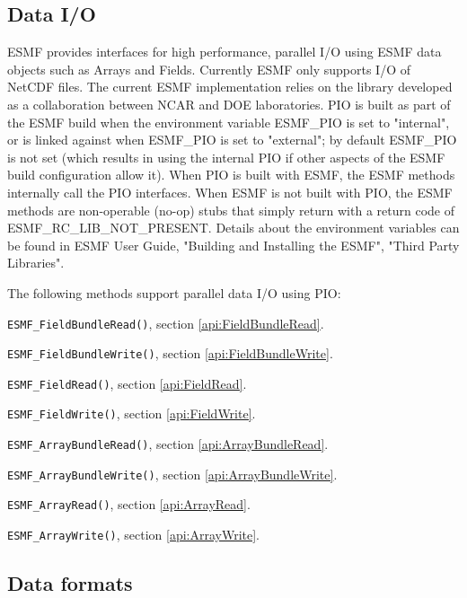 \subsection{Data I/O}
\label{io:dataio}

\begin{sloppypar}
ESMF provides interfaces for high performance, parallel I/O using ESMF data
objects such as Arrays and Fields.  Currently ESMF only supports I/O of
NetCDF files.  The current ESMF implementation relies on the 
library developed as a collaboration between NCAR and DOE laboratories.  PIO
is built as part of the ESMF build when the environment variable ESMF\_PIO is
set to "internal", or is linked against when ESMF\_PIO is set to "external"; by
default ESMF\_PIO is not set (which results in using the internal PIO if other
aspects of the ESMF build configuration allow it).  When PIO is built with ESMF,
the ESMF methods internally call the PIO interfaces.  When ESMF is not built with
PIO, the ESMF methods are non-operable (no-op) stubs that simply return with
a return code of ESMF\_RC\_LIB\_NOT\_PRESENT.  Details about the environment
variables can be found in ESMF User Guide, "Building and Installing the ESMF",
"Third Party Libraries".
\end{sloppypar}

The following methods support parallel data I/O using PIO:

\begin{description}
\item {\tt ESMF\_FieldBundleRead()}, section \ref{api:FieldBundleRead}.
\item {\tt ESMF\_FieldBundleWrite()}, section \ref{api:FieldBundleWrite}.
\item {\tt ESMF\_FieldRead()}, section \ref{api:FieldRead}.
\item {\tt ESMF\_FieldWrite()}, section \ref{api:FieldWrite}.
\item {\tt ESMF\_ArrayBundleRead()}, section \ref{api:ArrayBundleRead}.
\item {\tt ESMF\_ArrayBundleWrite()}, section \ref{api:ArrayBundleWrite}.
\item {\tt ESMF\_ArrayRead()}, section \ref{api:ArrayRead}.
\item {\tt ESMF\_ArrayWrite()}, section \ref{api:ArrayWrite}.
\end{description}


\subsection{Data formats}

